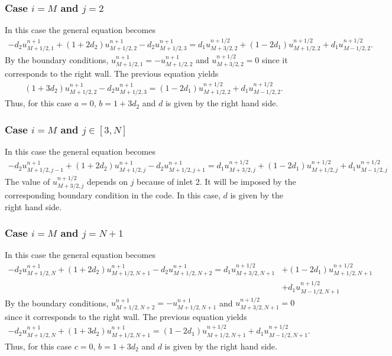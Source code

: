 \subsubsection*{Case $i=M$ and $j=2$}
In this case the general equation becomes
\begin{align*}
-d_2u_{M+1/2,1}^{n+1}+(1+2d_2)u_{M+1/2,2}^{n+1}-d_2u_{M+1/2,3}^{n+1}=d_1u_{M+3/2,2}^{n+1/2}+(1-2d_1)u_{M+1/2,2}^{n+1/2}+d_1u_{M-1/2,2}^{n+1/2}.
\end{align*}
By the boundary conditions, $u_{M+1/2,1}^{n+1}=-u_{M+1/2,2}^{n+1}$ and $u_{M+3/2,2}^{n+1/2}=0$ since it corresponds to the right wall. The previous equation yields
\begin{align*}
(1+3d_2)u_{M+1/2,2}^{n+1}-d_2u_{M+1/2,3}^{n+1}=(1-2d_1)u_{M+1/2,2}^{n+1/2}+d_1u_{M-1/2,2}^{n+1/2}.
\end{align*}
Thus, for this case $a=0$, $b=1+3d_2$ and $d$ is given by the right hand side.

\subsubsection*{Case $i=M$ and $j\in[3,N]$}
In this case the general equation becomes
\begin{align*}
-d_2u_{M+1/2,j-1}^{n+1}+(1+2d_2)u_{M+1/2,j}^{n+1}-d_2u_{M+1/2,j+1}^{n+1}=d_1u_{M+3/2,j}^{n+1/2}+(1-2d_1)u_{M+1/2,j}^{n+1/2}+d_1u_{M-1/2,j}^{n+1/2}
\end{align*}
The value of $u_{M+3/2,j}^{n+1/2}$ depends on $j$ because of inlet 2. It will be imposed by the corresponding boundary condition in the code. In this case, $d$ is given by the right hand side.

\subsubsection*{Case $i=M$ and $j=N+1$}
In this case the general equation becomes
\begin{align*}
-d_2u_{M+1/2,N}^{n+1}+(1+2d_2)u_{M+1/2,N+1}^{n+1}-d_2u_{M+1/2,N+2}^{n+1}=d_1u_{M+3/2,N+1}^{n+1/2}&+(1-2d_1)u_{M+1/2,N+1}^{n+1/2}\\&+d_1u_{M-1/2,N+1}^{n+1/2}
\end{align*}
By the boundary conditions, $u_{M+1/2,N+2}^{n+1}=-u_{M+1/2,N+1}^{n+1}$ and $u_{M+3/2,N+1}^{n+1/2}=0$ since it corresponds to the right wall. The previous equation yields
\begin{align*}
-d_2u_{M+1/2,N}^{n+1}+(1+3d_2)u_{M+1/2,N+1}^{n+1}=(1-2d_1)u_{M+1/2,N+1}^{n+1/2}+d_1u_{M-1/2,N+1}^{n+1/2}.
\end{align*}
Thus, for this case $c=0$, $b=1+3d_2$ and $d$ is given by the right hand side.